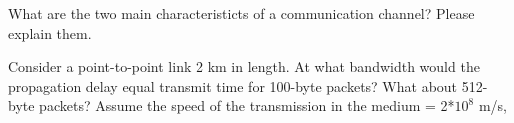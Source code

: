 \pagebreak


\begin{unteraufgaben}

\item What are the two main characteristicts of a communication channel? Please explain them.


\item Consider a point-to-point link 2 km in length. At what bandwidth would the propagation delay equal 
transmit time for 100-byte packets? What about 512-byte packets?
Assume the speed of the transmission in the medium =  2*$10^{8}$ m/s,

\end{unteraufgaben}

